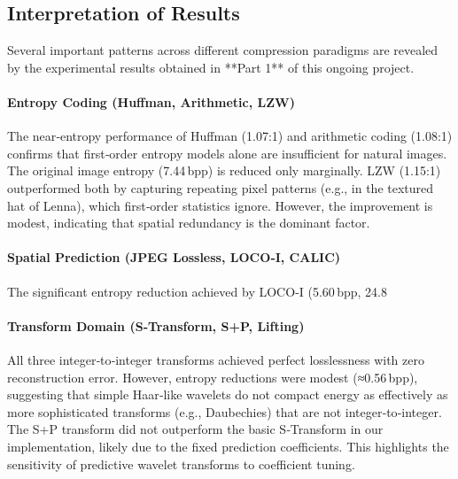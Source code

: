\subsection{Interpretation of Results}

Several important patterns across different compression paradigms are revealed by the experimental results obtained in **Part 1** of this ongoing project.

\paragraph{Entropy Coding (Huffman, Arithmetic, LZW)}  
The near‑entropy performance of Huffman (1.07:1) and arithmetic coding (1.08:1) confirms that first‑order entropy models alone are insufficient for natural images. The original image entropy (7.44 bpp) is reduced only marginally. LZW (1.15:1) outperformed both by capturing repeating pixel patterns (e.g., in the textured hat of Lenna), which first‑order statistics ignore. However, the improvement is modest, indicating that spatial redundancy is the dominant factor.

\paragraph{Spatial Prediction (JPEG Lossless, LOCO‑I, CALIC)}  
The significant entropy reduction achieved by LOCO‑I (5.60 bpp, 24.8%

\paragraph{Transform Domain (S‑Transform, S+P, Lifting)}  
All three integer‑to‑integer transforms achieved perfect losslessness with zero reconstruction error. However, entropy reductions were modest (≈0.56 bpp), suggesting that simple Haar‑like wavelets do not compact energy as effectively as more sophisticated transforms (e.g., Daubechies) that are not integer‑to‑integer. The S+P transform did not outperform the basic S‑Transform in our implementation, likely due to the fixed prediction coefficients. This highlights the sensitivity of predictive wavelet transforms to coefficient tuning.

